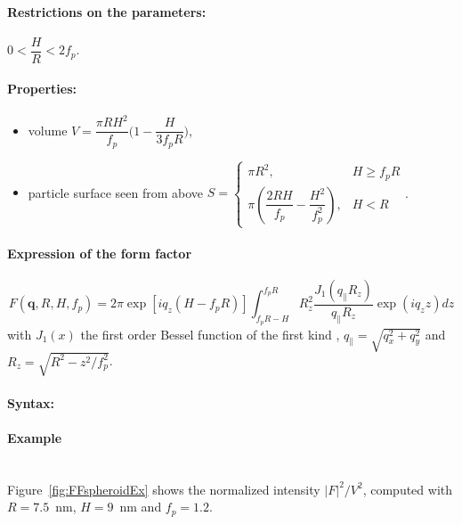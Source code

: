 \paragraph{Restrictions on the parameters:} $0< \dfrac{H}{R}< 2f_p$.

\paragraph{Properties:}
\begin{itemize}
\item volume $V = \dfrac{\pi R H^2}{f_p}  \Big(1-\dfrac{H}{3f_p R}\Big)$,
\item particle surface seen from above $S = \left\{\begin{array}{ll} \pi R^2, & H \geq f_pR \\
         \pi\left(\dfrac{2RH}{f_p}-\dfrac{H^2}{f_p^2}\right), & H < R \end{array}\right.$.
\end{itemize}

\paragraph{Expression of the form factor}
\begin{equation*} 
F(\mathbf{q},R, H,f_p) =   2\pi \exp[iq_z(H-f_pR)] \int_{f_p R-H} ^{f_p R} R_z
        ^2\frac{J_1(q_{\parallel}R_z)}{q_{\parallel}R_z} \exp(i q_z z) dz
\end{equation*}
with $J_1(x)$ the first order
Bessel function of the first kind \cite{AbSt64}, $q_{\parallel}=\sqrt{q_x^2+q_y^2} $ and $R_z=\sqrt{R^2-z^2/f_p^2}$.

\paragraph{Syntax:} 

\paragraph{Example}\mbox{}\\
Figure~\ref{fig:FFspheroidEx} shows the normalized intensity
$|F|^2/V^2$, computed with $R=7.5$~nm, $H=9$~nm and $f_p=1.2$.

